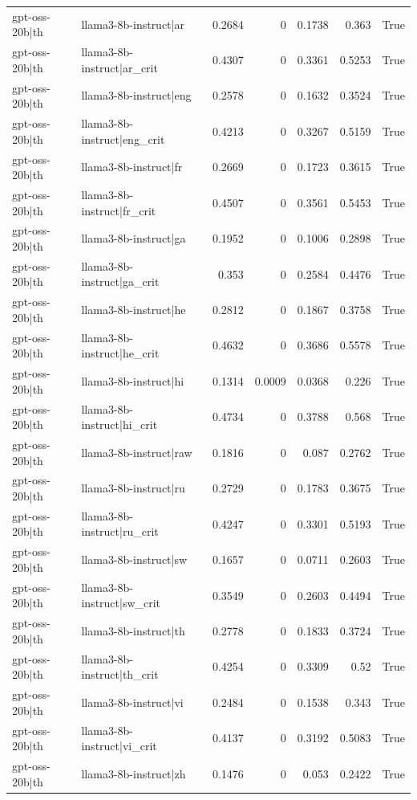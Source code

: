 \begin{table}
\begin{tabular}{l l r r r r l}
gpt-oss-20b|th & llama3-8b-instruct|ar & 0.2684 & 0 & 0.1738 & 0.363 & True \\
gpt-oss-20b|th & llama3-8b-instruct|ar_crit & 0.4307 & 0 & 0.3361 & 0.5253 & True \\
gpt-oss-20b|th & llama3-8b-instruct|eng & 0.2578 & 0 & 0.1632 & 0.3524 & True \\
gpt-oss-20b|th & llama3-8b-instruct|eng_crit & 0.4213 & 0 & 0.3267 & 0.5159 & True \\
gpt-oss-20b|th & llama3-8b-instruct|fr & 0.2669 & 0 & 0.1723 & 0.3615 & True \\
gpt-oss-20b|th & llama3-8b-instruct|fr_crit & 0.4507 & 0 & 0.3561 & 0.5453 & True \\
gpt-oss-20b|th & llama3-8b-instruct|ga & 0.1952 & 0 & 0.1006 & 0.2898 & True \\
gpt-oss-20b|th & llama3-8b-instruct|ga_crit & 0.353 & 0 & 0.2584 & 0.4476 & True \\
gpt-oss-20b|th & llama3-8b-instruct|he & 0.2812 & 0 & 0.1867 & 0.3758 & True \\
gpt-oss-20b|th & llama3-8b-instruct|he_crit & 0.4632 & 0 & 0.3686 & 0.5578 & True \\
gpt-oss-20b|th & llama3-8b-instruct|hi & 0.1314 & 0.0009 & 0.0368 & 0.226 & True \\
gpt-oss-20b|th & llama3-8b-instruct|hi_crit & 0.4734 & 0 & 0.3788 & 0.568 & True \\
gpt-oss-20b|th & llama3-8b-instruct|raw & 0.1816 & 0 & 0.087 & 0.2762 & True \\
gpt-oss-20b|th & llama3-8b-instruct|ru & 0.2729 & 0 & 0.1783 & 0.3675 & True \\
gpt-oss-20b|th & llama3-8b-instruct|ru_crit & 0.4247 & 0 & 0.3301 & 0.5193 & True \\
gpt-oss-20b|th & llama3-8b-instruct|sw & 0.1657 & 0 & 0.0711 & 0.2603 & True \\
gpt-oss-20b|th & llama3-8b-instruct|sw_crit & 0.3549 & 0 & 0.2603 & 0.4494 & True \\
gpt-oss-20b|th & llama3-8b-instruct|th & 0.2778 & 0 & 0.1833 & 0.3724 & True \\
gpt-oss-20b|th & llama3-8b-instruct|th_crit & 0.4254 & 0 & 0.3309 & 0.52 & True \\
gpt-oss-20b|th & llama3-8b-instruct|vi & 0.2484 & 0 & 0.1538 & 0.343 & True \\
gpt-oss-20b|th & llama3-8b-instruct|vi_crit & 0.4137 & 0 & 0.3192 & 0.5083 & True \\
gpt-oss-20b|th & llama3-8b-instruct|zh & 0.1476 & 0 & 0.053 & 0.2422 & True \\

\end{tabular}
\end{table}
